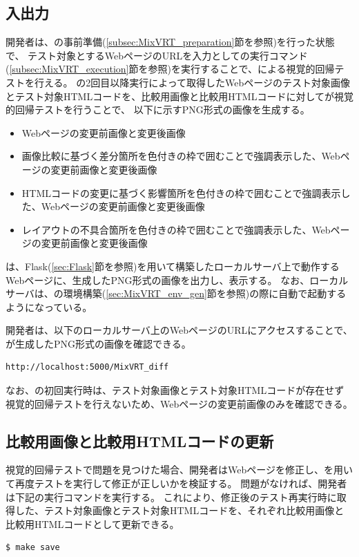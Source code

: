 \subsection{入出力}\label{subsec:MixVRT_IO}
開発者は、\toolName の事前準備(\ref{subsec:MixVRT_preparation}節を参照)を行った状態で、
テスト対象とするWebページのURLを入力として\toolName の実行コマンド(\ref{subsec:MixVRT_execution}節を参照)を実行することで、\toolName による視覚的回帰テストを行える。
\toolName の2回目以降実行によって取得したWebページのテスト対象画像とテスト対象HTMLコードを、比較用画像と比較用HTMLコードに対して\toolName が視覚的回帰テストを行うことで、
以下に示すPNG形式の画像を生成する。
\begin{itemize}
    \item Webページの変更前画像と変更後画像
    \item 画像比較に基づく差分箇所を色付きの枠で囲むことで強調表示した、Webページの変更前画像と変更後画像
    \item HTMLコードの変更に基づく影響箇所を色付きの枠で囲むことで強調表示した、Webページの変更前画像と変更後画像
    \item レイアウトの不具合箇所を色付きの枠で囲むことで強調表示した、Webページの変更前画像と変更後画像
\end{itemize}
\toolName は、Flask(\ref{sec:Flask}節を参照)を用いて構築したローカルサーバ上で動作するWebページに、生成したPNG形式の画像を出力し、表示する。
なお、ローカルサーバは、\toolName の環境構築(\ref{sec:MixVRT_env_gen}節を参照)の際に自動で起動するようになっている。
\par
開発者は、以下のローカルサーバ上のWebページのURLにアクセスすることで、\toolName が生成したPNG形式の画像を確認できる。
\begin{lstlisting}[label=list:command3,frame=none,numbers=none,basicstyle={\normalsize \ttfamily \color[gray]{.15}}]
    http://localhost:5000/MixVRT_diff
   \end{lstlisting}
なお、\toolName の初回実行時は、テスト対象画像とテスト対象HTMLコードが存在せず視覚的回帰テストを行えないため、Webページの変更前画像のみを確認できる。

\subsection{比較用画像と比較用HTMLコードの更新}\label{subsec:MixVRT_evaluate}
視覚的回帰テストで問題を見つけた場合、開発者はWebページを修正し、\toolName を用いて再度テストを実行して修正が正しいかを検証する。
問題がなければ、開発者は下記の実行コマンドを実行する。
これにより、修正後のテスト再実行時に取得した、テスト対象画像とテスト対象HTMLコードを、それぞれ比較用画像と比較用HTMLコードとして更新できる。
\begin{lstlisting}[label=list:command2,frame=none,numbers=none,basicstyle={\normalsize \ttfamily \color[gray]{.15}}]
    $ make save
\end{lstlisting}


